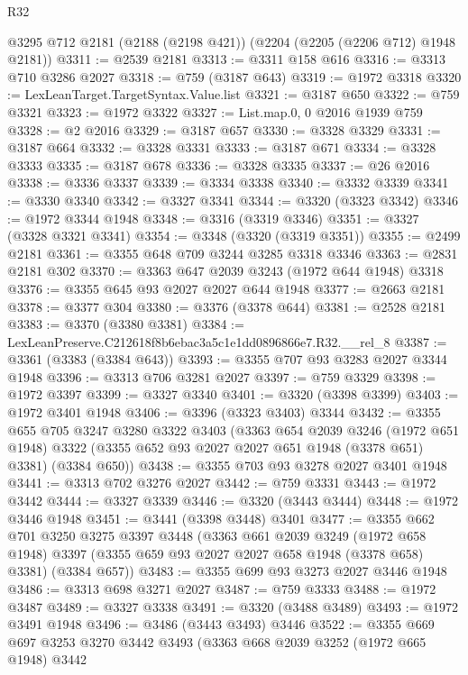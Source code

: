 \begin{lexlean}{R32}
\begin{coremodule}
    @3295
    @712
    @2181
    (@2188 (@2198 @421))
    (@2204 (@2205 (@2206 @712) @1948 @2181))
@3311 := @2539 @2181
@3313 := @3311 @158 @616
@3316 := @3313 @710 @3286 @2027
@3318 := @759 (@3187 @643)
@3319 := @1972 @3318
@3320 := LexLeanTarget.TargetSyntax.Value.list
@3321 := @3187 @650
@3322 := @759 @3321
@3323 := @1972 @3322
@3327 := List.map.{0, 0} @2016 @1939 @759
@3328 := @2 @2016
@3329 := @3187 @657
@3330 := @3328 @3329
@3331 := @3187 @664
@3332 := @3328 @3331
@3333 := @3187 @671
@3334 := @3328 @3333
@3335 := @3187 @678
@3336 := @3328 @3335
@3337 := @26 @2016
@3338 := @3336 @3337
@3339 := @3334 @3338
@3340 := @3332 @3339
@3341 := @3330 @3340
@3342 := @3327 @3341
@3344 := @3320 (@3323 @3342)
@3346 := @1972 @3344 @1948
@3348 := @3316 (@3319 @3346)
@3351 := @3327 (@3328 @3321 @3341)
@3354 := @3348 (@3320 (@3319 @3351))
@3355 := @2499 @2181
@3361 := @3355 @648 @709 @3244 @3285 @3318 @3346
@3363 := @2831 @2181 @302
@3370 := @3363 @647 @2039 @3243 (@1972 @644 @1948) @3318
@3376 := @3355 @645 @93 @2027 @2027 @644 @1948
@3377 := @2663 @2181
@3378 := @3377 @304
@3380 := @3376 (@3378 @644)
@3381 := @2528 @2181
@3383 := @3370 (@3380 @3381)
@3384 := LexLeanPreserve.C212618f8b6ebac3a5c1e1dd0896866e7.R32.__rel_8
@3387 := @3361 (@3383 (@3384 @643))
@3393 := @3355 @707 @93 @3283 @2027 @3344 @1948
@3396 := @3313 @706 @3281 @2027
@3397 := @759 @3329
@3398 := @1972 @3397
@3399 := @3327 @3340
@3401 := @3320 (@3398 @3399)
@3403 := @1972 @3401 @1948
@3406 := @3396 (@3323 @3403) @3344
@3432 := @3355
    @655
    @705
    @3247
    @3280
    @3322
    @3403
    (@3363
      @654
      @2039
      @3246
      (@1972 @651 @1948)
      @3322
      (@3355 @652 @93 @2027 @2027 @651 @1948 (@3378 @651) @3381)
      (@3384 @650))
@3438 := @3355 @703 @93 @3278 @2027 @3401 @1948
@3441 := @3313 @702 @3276 @2027
@3442 := @759 @3331
@3443 := @1972 @3442
@3444 := @3327 @3339
@3446 := @3320 (@3443 @3444)
@3448 := @1972 @3446 @1948
@3451 := @3441 (@3398 @3448) @3401
@3477 := @3355
    @662
    @701
    @3250
    @3275
    @3397
    @3448
    (@3363
      @661
      @2039
      @3249
      (@1972 @658 @1948)
      @3397
      (@3355 @659 @93 @2027 @2027 @658 @1948 (@3378 @658) @3381)
      (@3384 @657))
@3483 := @3355 @699 @93 @3273 @2027 @3446 @1948
@3486 := @3313 @698 @3271 @2027
@3487 := @759 @3333
@3488 := @1972 @3487
@3489 := @3327 @3338
@3491 := @3320 (@3488 @3489)
@3493 := @1972 @3491 @1948
@3496 := @3486 (@3443 @3493) @3446
@3522 := @3355
    @669
    @697
    @3253
    @3270
    @3442
    @3493
    (@3363
      @668
      @2039
      @3252
      (@1972 @665 @1948)
      @3442

\end{coremodule}
\end{lexlean}

